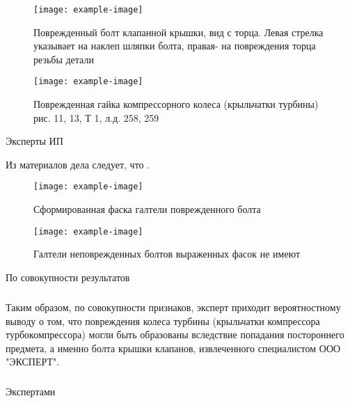 \begin{figure}[!h]\centering
	\parbox[t]{0.49\textwidth}
	{\centering
		\texttt{[image: example-image]}
		\caption{\footnotesize {Поврежденный болт клапанной крышки, вид с торца. Левая стрелка указывает на наклеп шляпки болта, правая- на повреждения торца резьбы детали }}
		\label{ris:images/b2}}
	\hfil \hfil
	\parbox[t]{0.49\textwidth}
	{\centering
		\texttt{[image: example-image]}
		\caption{\footnotesize {Поврежденная гайка  компрессорного колеса (крыльчатки турбины)
				рис. 11, 13, Т 1, л.д. 258, 259}}
		\label{ris:images/g1}}
	
\end{figure}


Эксперты ИП 
%

Из материалов дела следует, что .


\relax
\begin{figure}[h!]\centering
	\parbox[t]{0.49\textwidth}
	{\centering
		\texttt{[image: example-image]}
		\caption{\footnotesize {Сформированная фаска галтели поврежденного болта}}
		\label{ris:images/b3}}
	\hfil \hfil
	\parbox[t]{0.49\textwidth}
	{\centering
		\texttt{[image: example-image]}
		\caption{\footnotesize {Галтели неповрежденных болтов выраженных 
				фасок не имеют}}
		\label{ris:images/b4}}
\end{figure}

По совокупности результатов
\subparagraph*{}Таким образом, по совокупности признаков, эксперт приходит вероятностному  выводу о том, что повреждения колеса турбины (крыльчатки компрессора турбокомпрессора) могли быть образованы вследствие попадания постороннего предмета, а именно болта крышки клапанов, извлеченного специалистом ООО "ЭКСПЕРТ". 

\subparagraph*{}  Экспертами 


% 
% 
% 
